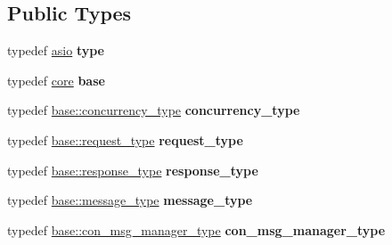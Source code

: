 \subsection*{Public Types}
\begin{DoxyCompactItemize}
\item 
typedef \hyperlink{structwebsocketpp_1_1config_1_1asio}{asio} {\bfseries type}\hypertarget{structwebsocketpp_1_1config_1_1asio_a14c6f9da27b459266c165df5f40e4ba1}{}\label{structwebsocketpp_1_1config_1_1asio_a14c6f9da27b459266c165df5f40e4ba1}

\item 
typedef \hyperlink{structwebsocketpp_1_1config_1_1core}{core} {\bfseries base}\hypertarget{structwebsocketpp_1_1config_1_1asio_a7f88d72d2fdfa55bd0c96e45709f8199}{}\label{structwebsocketpp_1_1config_1_1asio_a7f88d72d2fdfa55bd0c96e45709f8199}

\item 
typedef \hyperlink{classwebsocketpp_1_1concurrency_1_1basic}{base\+::concurrency\+\_\+type} {\bfseries concurrency\+\_\+type}\hypertarget{structwebsocketpp_1_1config_1_1asio_a4f2036249aa6a4a627ac42cc38cdaa06}{}\label{structwebsocketpp_1_1config_1_1asio_a4f2036249aa6a4a627ac42cc38cdaa06}

\item 
typedef \hyperlink{classwebsocketpp_1_1http_1_1parser_1_1request}{base\+::request\+\_\+type} {\bfseries request\+\_\+type}\hypertarget{structwebsocketpp_1_1config_1_1asio_ab378f1fa9cdbf4736b0202666c9abe53}{}\label{structwebsocketpp_1_1config_1_1asio_ab378f1fa9cdbf4736b0202666c9abe53}

\item 
typedef \hyperlink{classwebsocketpp_1_1http_1_1parser_1_1response}{base\+::response\+\_\+type} {\bfseries response\+\_\+type}\hypertarget{structwebsocketpp_1_1config_1_1asio_a2336ebfd28c36b1e66257ae57ad5296c}{}\label{structwebsocketpp_1_1config_1_1asio_a2336ebfd28c36b1e66257ae57ad5296c}

\item 
typedef \hyperlink{classwebsocketpp_1_1message__buffer_1_1message}{base\+::message\+\_\+type} {\bfseries message\+\_\+type}\hypertarget{structwebsocketpp_1_1config_1_1asio_a89136a9c3a37041226d8d2aaea90fdb1}{}\label{structwebsocketpp_1_1config_1_1asio_a89136a9c3a37041226d8d2aaea90fdb1}

\item 
typedef \hyperlink{classwebsocketpp_1_1message__buffer_1_1alloc_1_1con__msg__manager}{base\+::con\+\_\+msg\+\_\+manager\+\_\+type} {\bfseries con\+\_\+msg\+\_\+manager\+\_\+type}\hypertarget{structwebsocketpp_1_1config_1_1asio_a3473cd31498718e4cc11d5b34f71d4e6}{}\label{structwebsocketpp_1_1config_1_1asio_a3473cd31498718e4cc11d5b34f71d4e6}


\end{DoxyCompactItemize}
